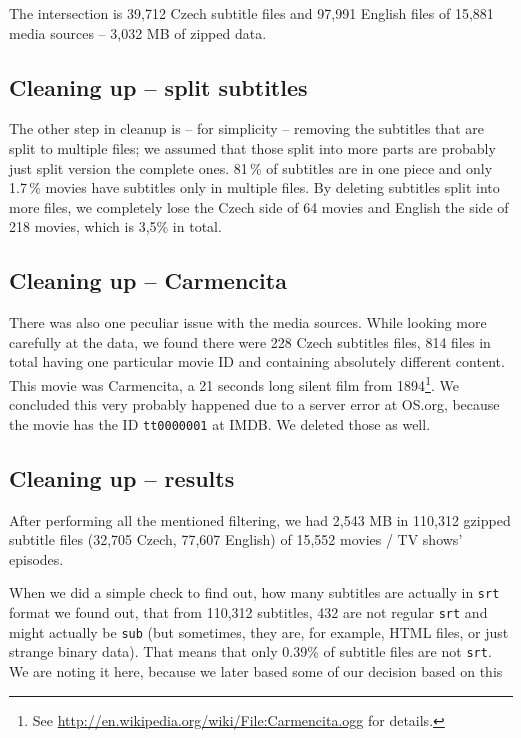 The intersection is 39,712 Czech subtitle files and 97,991 English files of 15,881 media sources -- 3,032 MB of zipped data.

\subsection*{Cleaning up -- split subtitles}
The other step in cleanup is -- for simplicity -- removing the subtitles that are split to multiple files; we assumed that those split into more parts are probably just split version the complete ones. 81\,\% of subtitles are in one piece and only 1.7\,\% movies have subtitles only in multiple files. By deleting subtitles split into more files, we completely lose the Czech side of 64 movies and English the side of 218 movies, which is 3,5\% in total.

\subsection*{Cleaning up -- Carmencita}
There was also one peculiar issue with the media sources. While looking more carefully at the data, we found there were 228 Czech subtitles files, 814 files in total having one particular movie ID and containing absolutely different content. This movie was Carmencita, a 21 seconds long silent film from 1894\footnote{See \url{http://en.wikipedia.org/wiki/File:Carmencita.ogg} for details.}. We concluded this very probably happened due to a server error at OS.org, because the movie has the ID {\tt tt0000001} at IMDB. We deleted those as well.


\subsection*{Cleaning up -- results}
After performing all the mentioned filtering, we had 2,543 MB in 110,312 gzipped subtitle files (32,705 Czech, 77,607 English) of 15,552 movies / TV shows' episodes.

When we did a simple check to find out, how many subtitles are actually in \texttt{srt} format we found out, that from 110,312 subtitles, 432 are not regular \texttt{srt} and might actually be \texttt{sub} (but sometimes, they are, for example, HTML files, or just strange binary data). That means that only 0.39\% of subtitle files are not \texttt{srt}. We are noting it here, because we later based some of our decision based on this

